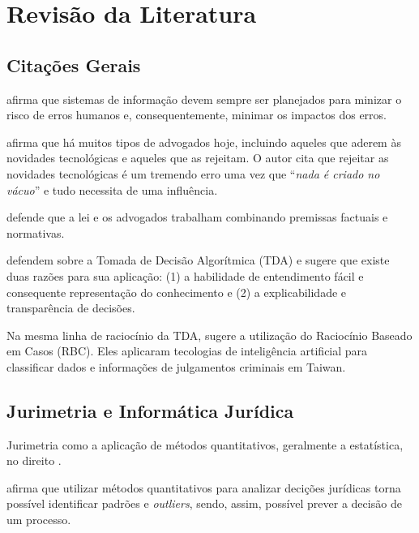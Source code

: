 \documentclass[
]{book}
\begin{document}
\hypertarget{revisuxe3o-da-literatura}{%
\chapter{Revisão da Literatura}\label{revisuxe3o-da-literatura}}

\hypertarget{citauxe7uxf5es-gerais}{%
\section{Citações Gerais}\label{citauxe7uxf5es-gerais}}

\citet{Saarenpaä2018} afirma que sistemas de informação devem sempre ser planejados para minizar o risco de erros humanos e, consequentemente, minimar os impactos dos erros.

\citet{Saarenpaä2018} afirma que há muitos tipos de advogados hoje, incluindo aqueles que aderem às novidades tecnológicas e aqueles que as rejeitam. O autor cita que rejeitar as novidades tecnológicas é um tremendo erro uma vez que ``\emph{nada é criado no vácuo}'' e tudo necessita de uma influência.

\citet{Saarenpaä2018} defende que a lei e os advogados trabalham combinando premissas factuais e normativas.

\citet{Waltl2018} defendem sobre a Tomada de Decisão Algorítmica (TDA) e sugere que existe duas razões para sua aplicação: (1) a habilidade de entendimento fácil e consequente representação do conhecimento e (2) a explicabilidade e transparência de decisões.

Na mesma linha de raciocínio da TDA, \citet{liu2004} sugere a utilização do Raciocínio Baseado em Casos (RBC). Eles aplicaram tecologias de inteligência artificial para classificar dados e informações de julgamentos criminais em Taiwan.

\hypertarget{jurimetria-e-informuxe1tica-juruxeddica}{%
\section{Jurimetria e Informática Jurídica}\label{jurimetria-e-informuxe1tica-juruxeddica}}

Jurimetria como a aplicação de métodos quantitativos, geralmente a estatística, no direito \citep{Colombo2017}.

\citet{Colombo2017} afirma que utilizar métodos quantitativos para analizar decições jurídicas torna possível identificar padrões e \emph{outliers}, sendo, assim, possível prever a decisão de um processo.
\end{document}
